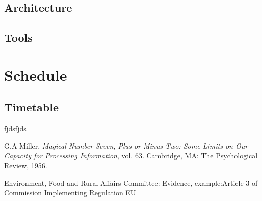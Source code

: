 \documentclass[a4paper, 11pt]{article}
\begin{document}
\subsection{Architecture}
\subsection{Tools}

\clearpage

\section{Schedule}
\subsection{Timetable}

\clearpage

\begin{thebibliography}{11}

	fjdsfjds
	
	G.A Miller, \emph{Magical Number Seven, Plus or Minus Two: Some Limits on Our Capacity for Processing Information}, vol. 63. Cambridge, MA: The Psychological Review, 1956.

Environment, Food and Rural Affairs Committee: Evidence,
example:Article 3 of Commission Implementing Regulation EU


\end{thebibliography}
\end{document}
